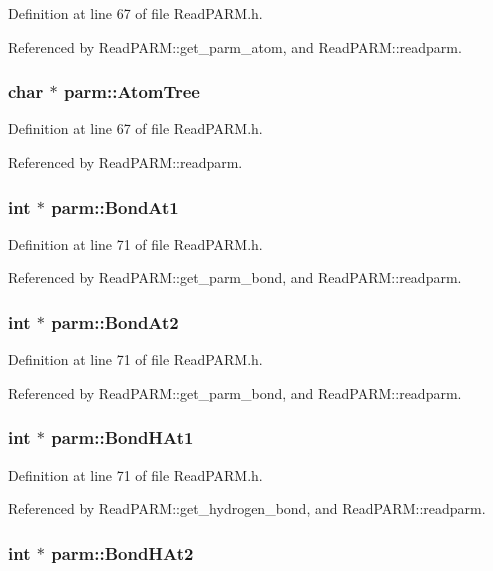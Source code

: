 Definition at line 67 of file Read\-PARM.h.

Referenced by Read\-PARM::get\_\-parm\_\-atom, and Read\-PARM::readparm.
\subsubsection{\setlength{\rightskip}{0pt plus 5cm}char $\ast$ parm::Atom\-Tree}\label{structparm_m35}




Definition at line 67 of file Read\-PARM.h.

Referenced by Read\-PARM::readparm.
\subsubsection{\setlength{\rightskip}{0pt plus 5cm}int $\ast$ parm::Bond\-At1}\label{structparm_m65}




Definition at line 71 of file Read\-PARM.h.

Referenced by Read\-PARM::get\_\-parm\_\-bond, and Read\-PARM::readparm.
\subsubsection{\setlength{\rightskip}{0pt plus 5cm}int $\ast$ parm::Bond\-At2}\label{structparm_m66}




Definition at line 71 of file Read\-PARM.h.

Referenced by Read\-PARM::get\_\-parm\_\-bond, and Read\-PARM::readparm.
\subsubsection{\setlength{\rightskip}{0pt plus 5cm}int $\ast$ parm::Bond\-HAt1}\label{structparm_m62}




Definition at line 71 of file Read\-PARM.h.

Referenced by Read\-PARM::get\_\-hydrogen\_\-bond, and Read\-PARM::readparm.
\subsubsection{\setlength{\rightskip}{0pt plus 5cm}int $\ast$ parm::Bond\-HAt2}\label{structparm_m63}




